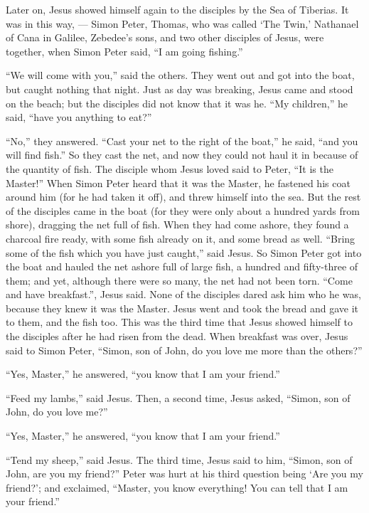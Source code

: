  Later on, Jesus showed himself again to the disciples by
the Sea of Tiberias.  It was in this way, --- Simon Peter,
Thomas, who was called `The Twin,' Nathanael of Cana in Galilee,
Zebedee's sons, and two other disciples of Jesus, were together, when
Simon Peter said,  ``I am going fishing.''

``We will come with you,'' said the others. They went out and got into
the boat, but caught nothing that night.  Just as day was
breaking, Jesus came and stood on the beach; but the disciples did not
know that it was he.  ``My children,'' he said, ``have you
anything to eat?''

``No,'' they answered.  ``Cast your net to the right of the
boat,'' he said, ``and you will find fish.'' So they cast the net, and
now they could not haul it in because of the quantity of fish.
 The disciple whom Jesus loved said to Peter, ``It is the
Master!'' When Simon Peter heard that it was the Master, he fastened his
coat around him (for he had taken it off), and threw himself into the
sea.  But the rest of the disciples came in the boat (for
they were only about a hundred yards from shore), dragging the net full
of fish.  When they had come ashore, they found a charcoal
fire ready, with some fish already on it, and some bread as well.
 ``Bring some of the fish which you have just caught,''
said Jesus.  So Simon Peter got into the boat and hauled
the net ashore full of large fish, a hundred and fifty-three of them;
and yet, although there were so many, the net had not been torn.
 ``Come and have breakfast.'', Jesus said. None of the
disciples dared ask him who he was, because they knew it was the Master.
 Jesus went and took the bread and gave it to them, and the
fish too.  This was the third time that Jesus showed
himself to the disciples after he had risen from the dead. 
When breakfast was over, Jesus said to Simon Peter, ``Simon, son of
John, do you love me more than the others?''

``Yes, Master,'' he answered, ``you know that I am your friend.''

``Feed my lambs,'' said Jesus.  Then, a second time, Jesus
asked, ``Simon, son of John, do you love me?''

``Yes, Master,'' he answered, ``you know that I am your friend.''

``Tend my sheep,'' said Jesus.  The third time, Jesus said
to him, ``Simon, son of John, are you my friend?'' Peter was hurt at his
third question being `Are you my friend?'; and exclaimed, ``Master, you
know everything! You can tell that I am your friend.''

